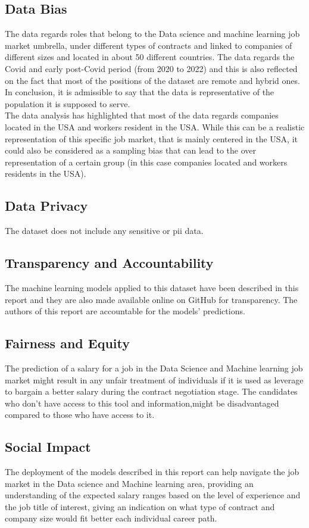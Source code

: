 \documentclass[11pt,a4paper]{article}
\begin{document}
\subsection{Data Bias}
The data regards roles that belong to the Data science and machine learning job market umbrella, under different types of contracts and linked to companies of different sizes and located in about 50 different countries. The data regards the Covid and early post-Covid period (from 2020 to 2022) and this is also reflected on the fact that most of the positions of the dataset are remote and hybrid ones. In conclusion, it is admissible to say that the data is representative of the population it is supposed to serve.\\
The data analysis has highlighted that most of the data regards companies located in the USA and workers resident in the USA. While this can be a realistic representation of this specific job market, that is mainly centered in the USA, it could also be considered as a sampling bias that can lead to the over representation of a certain group (in this case companies located and workers residents in the USA). 
\subsection{Data Privacy}
The dataset does not include any sensitive or \acrfull{pii} data.
\subsection{Transparency and Accountability}
The machine learning models applied to this dataset have been described in this report and they are also made available online on GitHub for transparency. The authors of this report are accountable for the models’ predictions.
\subsection{Fairness and Equity}
The prediction of a salary for a job in the Data Science and Machine learning job market might result in any unfair treatment of individuals if it is used as leverage to bargain a better salary during the contract negotiation stage. The candidates who don’t have access to this tool and information,might be disadvantaged compared to those who have access to it.  
\subsection{Social Impact}
The deployment of the models described in this report can help navigate the job market in the Data science and Machine learning area, providing an understanding of the expected salary ranges based on the level of  experience and the job title of interest, giving an indication on what type of contract and company size would fit better each individual career path.  
\end{document}
